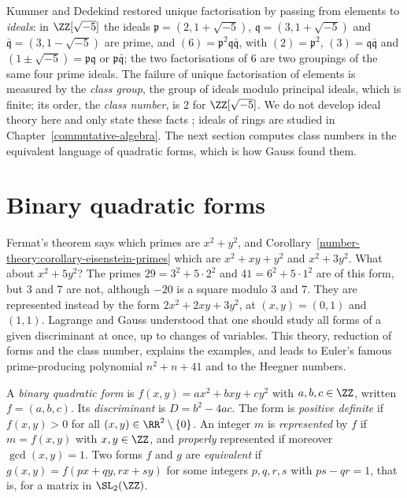 Kummer and Dedekind restored unique factorisation by passing from elements to \emph{ideals}: in $\ZZ[\sqrt{-5}]$ the ideals $\mathfrak{p} = (2, 1 + \sqrt{-5})$, $\mathfrak{q} = (3, 1 + \sqrt{-5})$ and
$\bar{\mathfrak{q}} = (3, 1 - \sqrt{-5})$ are prime, and $(6) = \mathfrak{p}^2\mathfrak{q}\bar{\mathfrak{q}}$, with $(2) = \mathfrak{p}^2$, $(3) = \mathfrak{q}\bar{\mathfrak{q}}$ and
$(1 \pm \sqrt{-5}) = \mathfrak{p}\mathfrak{q}$ or $\mathfrak{p}\bar{\mathfrak{q}}$; the two factorisations of $6$ are two groupings of the same four prime ideals. The failure of unique factorisation of
elements is measured by the \emph{class group}, the group of ideals modulo principal ideals, which is finite; its order, the \emph{class number}, is $2$ for $\ZZ[\sqrt{-5}]$. We do not develop ideal theory here and only state these facts \cite{ireland-rosen}; ideals of rings are studied in Chapter~\ref{commutative-algebra}. The next section computes
class numbers in the equivalent language of quadratic forms, which is how Gauss found them.

\section{Binary quadratic forms}\label{number-theory:section-quadratic-forms}

Fermat's theorem says which primes are $x^2 + y^2$, and Corollary~\ref{number-theory:corollary-eisenstein-primes} which are $x^2 + xy + y^2$ and $x^2 + 3y^2$. What about $x^2 + 5y^2$? The primes
$29 = 3^2 + 5 \cdot 2^2$ and $41 = 6^2 + 5 \cdot 1^2$ are of this form, but $3$ and $7$ are not, although $-20$ is a square modulo $3$ and $7$. They are represented instead by the form
$2x^2 + 2xy + 3y^2$, at $(x, y) = (0, 1)$ and $(1, 1)$. Lagrange and Gauss understood that one should study all forms of a given discriminant at once, up to changes of
variables. This theory, reduction of forms and the class number, explains the examples, and leads to Euler's famous prime-producing polynomial $n^2 + n + 41$ and to the Heegner numbers.

\begin{definition}\label{number-theory:definition-binary-form}
A \emph{binary quadratic form} is $f(x, y) = ax^2 + bxy + cy^2$ with $a, b, c \in \ZZ$, written $f = (a, b, c)$. Its \emph{discriminant} is $D = b^2 - 4ac$. The form is \emph{positive definite} if
$f(x, y) > 0$ for all $(x, y) \in \RR^2 \setminus \{0\}$. An integer $m$ is \emph{represented} by $f$ if $m = f(x, y)$ with $x, y \in \ZZ$, and \emph{properly} represented if moreover $\gcd(x, y) = 1$. Two forms
$f$ and $g$ are \emph{equivalent} if $g(x, y) = f(px + qy, rx + sy)$ for some integers $p, q, r, s$ with $ps - qr = 1$, that is, for a matrix in $\SL_2(\ZZ)$.
\end{definition}

